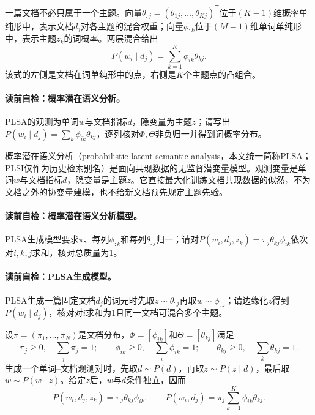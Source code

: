 一篇文档不必只属于一个主题。向量$\theta_{:j}=(\theta_{1j},\ldots,\theta_{Kj})^{\mathsf T}$位于$(K-1)$维概率单纯形中，表示文档$d_j$对各主题的混合权重；向量$\phi_{:k}$位于$(M-1)$维单词单纯形中，表示主题$z_k$的词概率。两层混合给出
\[
P(w_i\mid d_j)=\sum_{k=1}^K\phi_{ik}\theta_{kj}.
\]
该式的左侧是文档在词单纯形中的点，右侧是$K$个主题点的凸组合。

\paragraph{读前自检：概率潜在语义分析。}PLSA的观测为单词$w$与文档指标$d$，隐变量为主题$z$；请写出$P(w_i\mid d_j)=\sum_k\phi_{ik}\theta_{kj}$，逐列核对$\Phi,\Theta$非负归一并得到词概率分布。\par

概率潜在语义分析（probabilistic latent semantic analysis，本文统一简称PLSA；PLSI仅作为历史检索别名）是面向共现数据的无监督潜变量模型。观测变量是单词$w$与文档指标$d$，隐变量是主题$z$。它直接最大化训练文档共现数据的似然，不为文档之外的协变量建模，也不给新文档预先规定主题先验。

\paragraph{读前自检：概率潜在语义分析模型。}PLSA生成模型要求$\pi$、每列$\phi_{:k}$和每列$\theta_{:j}$归一；请对$P(w_i,d_j,z_k)=\pi_j\theta_{kj}\phi_{ik}$依次对$i,k,j$求和，核对总质量为1。\par

\label{struct:V4-C06-CH07}
\paragraph{读前自检：PLSA生成模型。}PLSA生成一篇固定文档$d_j$的词元时先取$z\sim\theta_{:j}$再取$w\sim\phi_{:z}$；请边缘化$z$得到$P(w_i\mid d_j)$，核对对$i$求和为1且同一文档可混合多个主题。\par

\begin{definition}[PLSA生成模型]\label{def:V4-C06-generative}
设$\pi=(\pi_1,\ldots,\pi_N)$是文档分布，$\Phi=[\phi_{ik}]$和$\Theta=[\theta_{kj}]$满足
\[
\pi_j\ge0,\quad\sum_j\pi_j=1;\qquad
\phi_{ik}\ge0,\quad\sum_i\phi_{ik}=1;\qquad
\theta_{kj}\ge0,\quad\sum_k\theta_{kj}=1.
\]
生成一个单词--文档观测对时，先取$d\sim P(d)$，再取$z\sim P(z\mid d)$，最后取$w\sim P(w\mid z)$。给定$z$后，$w$与$d$条件独立，因而
\[
P(w_i,d_j,z_k)=\pi_j\theta_{kj}\phi_{ik},\qquad
P(w_i,d_j)=\pi_j\sum_{k=1}^K\phi_{ik}\theta_{kj}.
\]
\end{definition}

